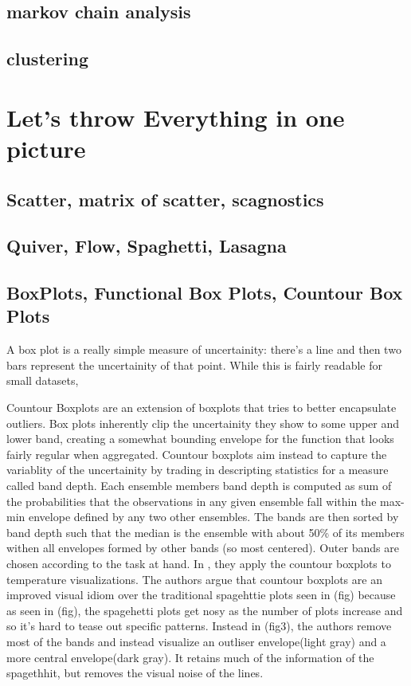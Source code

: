 \documentclass[letterpaper,onecolumn,titlepage]{Ythesis}
\begin{document}
\subsection{markov chain analysis}
\subsection{clustering}

\section{Let's throw Everything in one picture}                                                        
\subsection{Scatter, matrix of scatter, scagnostics}                                        
\subsection{Quiver, Flow, Spaghetti, Lasagna}
\subsection{BoxPlots, Functional Box Plots, Countour Box Plots}                                      
A box plot is a really simple measure of uncertainity: there's a line and then two bars represent the uncertainity of that point. %
While this is fairly readable for small datasets, %




Countour Boxplots \cite{Whitaker2013} are an extension of boxplots that tries to better encapsulate outliers. Box plots inherently clip the uncertainity they show to some upper and lower band, 
creating a somewhat bounding envelope for the function that looks fairly regular when aggregated. Countour boxplots aim instead to capture the variablity of the uncertainity by trading in descripting
statistics for a measure called band depth. Each ensemble members band depth is computed as sum of the probabilities that the observations in any given ensemble fall within the max-min envelope defined by any two other ensembles. The bands are then sorted by band depth such that the median is the ensemble with about 50\% of its members withen all envelopes formed by other bands (so most centered). Outer bands are chosen according to the task at hand. In \cite{Whitaker2013}, they apply the countour boxplots to temperature visualizations. %
The authors argue that countour boxplots are an improved visual idiom over the traditional spagehttie plots seen in (fig) because as seen in (fig), the spagehetti plots get nosy as the number of plots increase and so it's hard to tease out specific patterns. Instead in (fig3), the authors remove most of the bands and instead visualize an outliser envelope(light gray) and a more central envelope(dark gray). It retains much of the information of the spagethhit, but removes the visual noise of the lines.  
\end{document}
